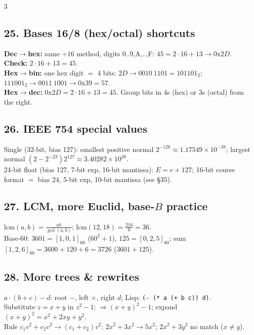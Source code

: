 \documentclass[9pt]{extarticle}
\newcommand{\hl}[1]{\textbf{\textcolor{BrickRed}{#1}}}
\begin{document}
\begin{multicols}{3}
\subsection{25. Bases 16/8 (hex/octal) shortcuts}
\begin{sloppypar}\raggedright
\textbf{Dec$\to$hex:} same $\div16$ method, digits $0..9$,A,..,F: $45{=}2{\cdot}16{+}13\to0\mathrm{x}2D$. \hl{Check:} $2{\cdot}16{+}13{=}45$.\\
\textbf{Hex$\to$bin:} one hex digit $=$ 4 bits: $2D\to0010\ 1101{=}101101_2$; $111001_2\to0011\ 1001\to0\mathrm{x}39{=}57$.\\
\textbf{Hex$\to$dec:} $0\mathrm{x}2D{=}2{\cdot}16{+}13{=}45$. Group bits in 4s (hex) or 3s (octal) from the right.
\end{sloppypar}

\subsection{26. IEEE 754 special values}
\begin{sloppypar}\raggedright
Single (32-bit, bias 127): smallest positive normal $2^{-126}\approx1.17549{\times}10^{-38}$; largest normal $(2{-}2^{-23})2^{127}\approx3.40282{\times}10^{38}$.\\
24-bit float (bias 127, 7-bit exp, 16-bit mantissa): $E{=}e{+}127$; 16-bit course format $=$ bias 24, 5-bit exp, 10-bit mantissa (see \S35).
\end{sloppypar}

\subsection{27. LCM, more Euclid, base-$B$ practice}
\begin{sloppypar}\raggedright
$\mathrm{lcm}(a,b){=}\frac{ab}{\gcd(a,b)}$: $\mathrm{lcm}(12,18){=}\frac{216}{6}{=}36$. \\
Base-60: $3601{=}[1,0,1]_{60}$ ($60^2{+}1$), $125{=}[0,2,5]_{60}$; sum $[1,2,6]_{60}{=}3600{+}120{+}6{=}3726$ ($3601{+}125$).\\
\end{sloppypar}

\subsection{28. More trees \& rewrites}
\begin{sloppypar}\raggedright
$a{\cdot}(b{+}c)-d$: root $-$, left $\times$, right $d$; Lisp: \texttt{(- (* a (+ b c)) d)}.\\
Substitute $z{=}x{+}y$ in $z^2{-}1$: $\Rightarrow(x{+}y)^2{-}1$; expand $(x{+}y)^2{=}x^2{+}2xy{+}y^2$.\\
Rule $c_1v^2{+}c_2v^2\to(c_1{+}c_2)v^2$: $2x^2{+}3x^2\to5x^2$; $2x^2{+}3y^2$ no match ($x\ne y$).
\end{sloppypar}


\end{multicols}
\end{document}
